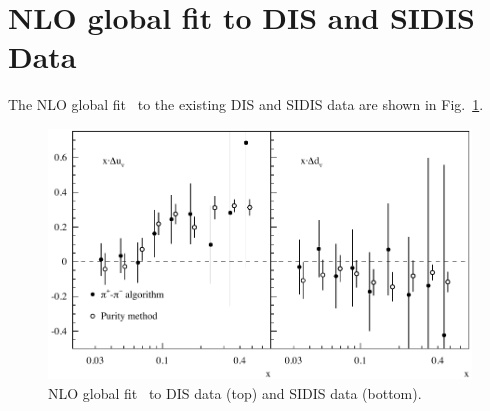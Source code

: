 \section{NLO global fit to DIS and SIDIS Data}
 The NLO global fit~\cite{DSSV2008} to the existing DIS and SIDIS data are shown in Fig.~\ref{fig:sasnlo}. 
\begin{figure}[htbp]
\vspace{-0.5cm}
  \centering
    \includegraphics[width=0.90\linewidth]{./figs_xj/hermes_thesis_cl_xuvdv-pions.pdf}
\vspace{-0.5cm}
\caption{\label{fig:sasnlo} NLO global fit~\protect\cite{sassotnlo} 
to DIS data (top) and SIDIS data (bottom). 
}
\end{figure}


